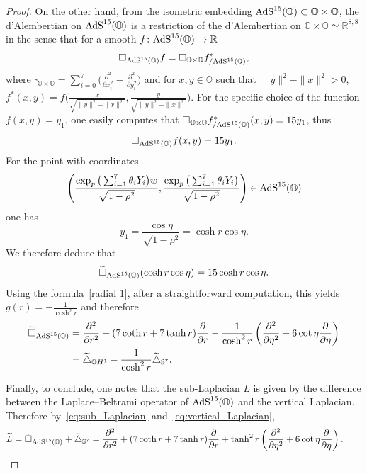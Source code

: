 \documentclass[10pt,a4paper]{amsart}
\numberwithin{equation}{section}
\begin{document}
\begin{proof}
On the other hand, from the isometric embedding ${\rm AdS}^{15}(\mathbb{O}) \subset \mathbb{O} \times \mathbb{O}$, the d'Alembertian on ${\rm AdS}^{15}(\mathbb{O})$ is a restriction of the d'Alembertian on $\mathbb{O} \times \mathbb{O} \simeq \mathbb{R}^{8,8}$ in the sense that for a smooth $f\colon {\rm AdS}^{15}(\mathbb{O}) \to \mathbb{R}$
\[
\square_{{\rm AdS}^{15}(\mathbb{O})} f =\square_{\mathbb O \times \mathbb O} f^*_{/ {\rm AdS}^{15}(\mathbb{O})},
\]
where $\square_{\mathbb O \times \mathbb O}=\sum_{i=0}^7 \big( \frac{\partial^2}{\partial x_i^2} - \frac{\partial^2}{\partial y_i^2} \big)$ and for $x,y \in \mathbb O$ such that $\| y\|^2 -\|x\|^2 >0$, $f^*(x,y)= f \big( \frac{x}{\sqrt{\| y \|^2 -\| x \|^2}}, \frac{y}{\sqrt{\| y \|^2 -\| x \|^2}}\big)$. For the specific choice of the function $f(x,y)=y_1$, one easily computes that $ \square_{\mathbb O \times \mathbb O} f^*_{/ {\rm AdS}^{15}(\mathbb{O})}(x,y) = 15y_1$, thus
\[
\square_{{\rm AdS}^{15}(\mathbb{O})} f (x,y)=15y_1.
\]
For the point with coordinates
\[
\left(\frac{ \exp_p\big(\sum_{i=1}^{7}\theta_i Y_i\big) w}{\sqrt{1-{\rho}^2}},\frac{ \exp_p\big(\sum_{i=1}^{7}\theta_i Y_i\big)}{\sqrt{1-{\rho}^2}}\right)\in {\rm AdS}^{15}(\mathbb{O})
\]
one has
\[
y_1=\frac{\cos \eta}{\sqrt{1-{\rho}^2}}= \cosh r \cos \eta.
\]
We therefore deduce that
\[
\widetilde{\square}_{{\rm AdS}^{15}(\mathbb{O})}(\cosh r \cos \eta) =15 \cosh r \cos \eta.
\]
Using the formula~\eqref{radial 1}, after a straightforward computation, this yields $g(r)=-\frac{1}{\cosh^2 r}$ and therefore
\begin{align*}
\widetilde{\square}_{{\rm AdS}^{15}(\mathbb{O})}&=\frac{{\partial}^2}{\partial {r}^2}+(7\coth r+7\tanh r)\frac{{\partial}}{\partial {r}} -\frac{1}{\cosh^2 r} \left(\frac{{\partial}^2}{\partial {\eta}^2}+6\cot \eta\frac{{\partial}}{\partial {\eta}} \right)\nonumber\\
& =\widetilde{\triangle}_{\mathbb{O}H^1}-\frac{1}{\cosh^2 r}\widetilde{\triangle}_{\mathbb{S}^7}.%
\end{align*}

Finally, to conclude, one notes that the sub-Laplacian $L$ is given by the difference between the Laplace--Beltrami operator of ${\rm AdS}^{15}(\mathbb{O})$ and the vertical Laplacian. Therefore by~\eqref{eq:sub_Laplacian} and~\eqref{eq:vertical_Laplacian},
\begin{align*}
\widetilde{L} =\tilde{\square}_{{\rm AdS}^{15}(\mathbb{O})}+ \tilde{\triangle}_{\mathbb{S}^{7}}
 = \frac{{\partial}^2}{\partial {r}^2}+(7\coth r+7\tanh r)\frac{{\partial}}{\partial {r}}+{\tanh^2 r}\left(\frac{{\partial}^2}{\partial {\eta}^2}+6\cot \eta\frac{{\partial}}{\partial {\eta}}\right).\tag*{\qed}
\end{align*}\renewcommand{\qed}{}
\end{proof}
\end{document}
